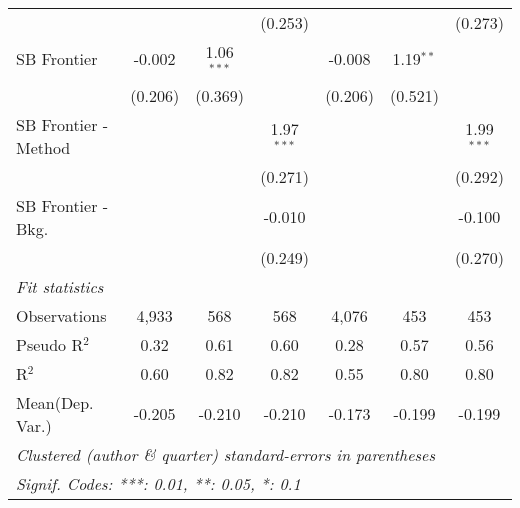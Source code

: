 \begin{tabular}{lcccccc}
                        &         &              & (0.253)      &         &             & (0.273)\\   
   SB Frontier          & -0.002  & 1.06$^{***}$ &              & -0.008  & 1.19$^{**}$ &   \\   
                        & (0.206) & (0.369)      &              & (0.206) & (0.521)     &   \\   
   SB Frontier - Method &         &              & 1.97$^{***}$ &         &             & 1.99$^{***}$\\   
                        &         &              & (0.271)      &         &             & (0.292)\\   
   SB Frontier - Bkg.   &         &              & -0.010       &         &             & -0.100\\   
                        &         &              & (0.249)      &         &             & (0.270)\\   
   \midrule
   \emph{Fit statistics}\\
   Observations         & 4,933   & 568          & 568          & 4,076   & 453         & 453\\  
   Pseudo R$^2$         & 0.32    & 0.61         & 0.60         & 0.28    & 0.57        & 0.56\\  
   R$^2$                & 0.60    & 0.82         & 0.82         & 0.55    & 0.80        & 0.80\\  
Mean(Dep. Var.) & -0.205 & -0.210 & -0.210 & -0.173 & -0.199 & -0.199 \\
   \midrule \midrule
   \multicolumn{7}{l}{\emph{Clustered (author \& quarter) standard-errors in parentheses}}\\
   \multicolumn{7}{l}{\emph{Signif. Codes: ***: 0.01, **: 0.05, *: 0.1}}\\
\end{tabular}
\par\endgroup
